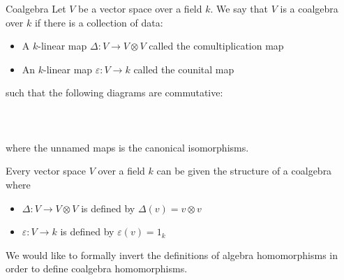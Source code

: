 \documentclass[a4paper]{article}
\begin{document}
\begin{defn}{Coalgebra}{} Let $V$ be a vector space over a field $k$. We say that $V$ is a coalgebra over $k$ if there is a collection of data: 
\begin{itemize}
\item A $k$-linear map $\Delta:V\to V\otimes V$ called the comultiplication map
\item An $k$-linear map $\varepsilon:V\to k$ called the counital map
\end{itemize} 
such that the following diagrams are commutative: \\~\\
\\~\\
where the unnamed maps is the canonical isomorphisms. 
\end{defn}

\begin{lmm}{}{} Every vector space $V$ over a field $k$ can be given the structure of a coalgebra where 
\begin{itemize}
\item $\Delta:V\to V\otimes V$ is defined by $\Delta(v)=v\otimes v$
\item $\varepsilon:V\to k$ is defined by $\varepsilon(v)=1_k$
\end{itemize}

\end{lmm}

We would like to formally invert the definitions of algebra homomorphisms in order to define coalgebra homomorphisms. 
\end{document}
